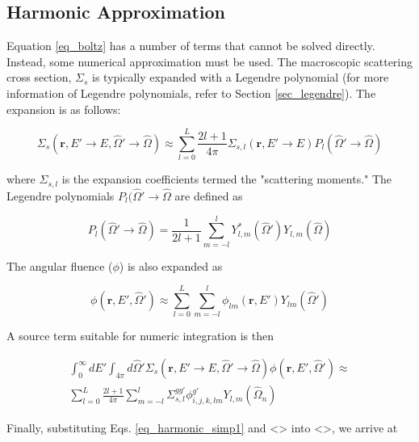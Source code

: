 \documentclass{article}
\numberwithin{equation}{subsection}
\begin{document}
\subsection{Harmonic Approximation}
Equation \ref{eq_boltz} has a number of terms that cannot be solved directly. Instead, some numerical approximation must be used. The macroscopic scattering cross section, $\Sigma_s$ is typically expanded with a Legendre polynomial (for more information of Legendre polynomials, refer to Section \ref{sec_legendre}). The expansion is as follows:

\begin{equation} \label{eq_sigma_expansion}
\Sigma_s(\boldsymbol{r}, E' \rightarrow E, \hat{\Omega}' \rightarrow \hat{\Omega}) \approx \sum_{l=0}^L \frac{2l+1}{4 \pi} \Sigma_{s,l}(\boldsymbol{r}, E' \rightarrow E) P_l(\hat{\Omega}' \rightarrow \hat{\Omega})
\end{equation}

where $\Sigma_{s,l}$ is the expansion coefficients termed the "scattering moments." The Legendre polynomials $P_l(\hat{\Omega}' \rightarrow \hat{\Omega}$ are defined as

\begin{equation} \label{eq_harmonic}
P_l(\hat{\Omega}' \rightarrow \hat{\Omega}) = \frac{1}{2l+1}\sum_{m=-l}^l Y_{l,m}^*(\hat{\Omega}')Y_{l,m}(\hat{\Omega})
\end{equation}

The angular fluence ($\phi$) is also expanded as

\begin{equation}
\phi(\boldsymbol{r}, E', \hat{\Omega}') \approx \sum_{l=0}^L \sum_{m=-l}^l
\phi_{lm}(\boldsymbol{r}, E')Y_{lm}(\hat{\Omega}')
\end{equation}

\noindent
A source term suitable for numeric integration is then

\begin{equation}\label{eq_harmonic_simp1}
\begin{split}
\int_0^\infty dE' \int_{4 \pi} d\hat{\Omega}' \Sigma_s(\boldsymbol{r}, E' \rightarrow E, \hat{\Omega}' \rightarrow \hat{\Omega}) \phi(\boldsymbol{r}, E', \hat{\Omega}')
\approx \\
 \sum_{l=0}^L \frac{2l+1}{4 \pi} \sum_{m=-l}^l \Sigma_{s,l}^{gg'}\phi_{i,j,k,lm}^{g'}Y_{l,m}(\hat{\Omega}_n)
\end{split}
\end{equation}

Finally, substituting Eqs. \ref{eq_harmonic_simp1} and <> into <>, we arrive at
\end{document}
